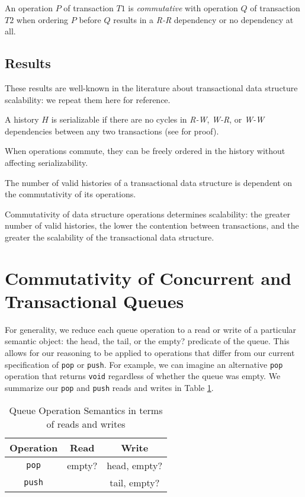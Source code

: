 \begin{defn}
    An operation $P$ of transaction $T1$ is \emph{commutative} with operation $Q$ of transaction $T2$ when ordering $P$ before $Q$ results in a \emph{R-R} dependency or no dependency at all.
\end{defn}

\subsection{Results}

These results are well-known in the literature about transactional data structure scalability: we repeat them here for reference.
\begin{theorem}
    A history $H$ is serializable if there are no cycles in \emph{R-W}, \emph{W-R}, or \emph{W-W} dependencies between any two transactions (see \cite{schwarz} for proof).
\end{theorem}

\begin{corollary}
    When operations commute, they can be freely ordered in the history without affecting serializability.
\end{corollary}
\begin{corollary}
    The number of valid histories of a transactional data structure is dependent on the commutativity of its operations.
\end{corollary}
\begin{corollary}
    Commutativity of data structure operations determines scalability: the greater number of valid histories, the lower the contention between transactions, and the greater the scalability of the transactional data structure. 
\end{corollary}


\section{Commutativity of Concurrent and Transactional Queues}

For generality, we reduce each queue operation to a read or write of a particular semantic object: the head, the tail, or the empty? predicate of the queue. This allows for our reasoning to be applied to operations that differ from our current specification of \texttt{pop} or \texttt{push}. For example, we can imagine an alternative \texttt{pop} operation that returns \texttt{void} regardless of whether the queue was empty. We summarize our \texttt{pop} and \texttt{push} reads and writes in Table \ref{table:qrw}.
\begin{table}
\centering
\begin{tabular}{c|cc}
    \hline
    Operation & Read & Write\\
    \hline
    \texttt{pop} & empty? & head, empty?\\
    \texttt{push} & & tail, empty?\\
    \hline
\end{tabular}
    \caption{Queue Operation Semantics in terms of reads and writes}
    \label{table:qrw}
\end{table}

